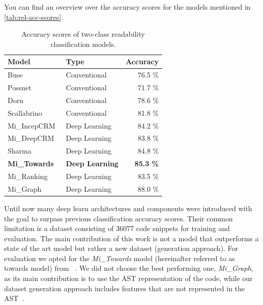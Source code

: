 \documentclass[%
class=scrreprt,
chapterprefix=false,%
open=right,%
twoside=false,%
paper=a4,%
logofile={Logo\_zentral\_farbig\_EN.png},%
thesistype=master,%
UKenglish,%
]{se2thesis}
\theoremstyle{definition}
\newcommand{\numOriginal}{36077 }
\begin{document}
	You can find an overview over the accuracy scores for the models mentioned in \autoref{tab:rel-acc-scores}.
	\begin{table}[tb]
		\centering
		\caption{Accuracy scores of two-class readability classification models.}
		\vspace{8pt}
		\label{tab:rel-acc-scores}
		\begin{tabular}{llr}
			\toprule
			Model & Type & Accuracy \\
			\midrule
			Buse~\cite{buse2009learning} & Conventional & 76.5 \% \\
			Possnet~\cite{posnett2011simpler} & Conventional & 71.7 \% \\
			Dorn~\cite{dorn2012general} & Conventional & 78.6 \% \\
			Scallabrino~\cite{scalabrino2018comprehensive} & Conventional & 81.8 \% \\
			Mi\_IncepCRM~\cite{mi2018inception} & Deep Learning & 84.2 \% \\
			Mi\_DeepCRM~\cite{mi2018improving} & Deep Learning & 83.8 \% \\
			Sharma~\cite{sharma2020egan} & Deep Learning & 84.8 \% \\
			\textbf{Mi\_Towards~\cite{mi2022towards}} & \textbf{Deep Learning} & \textbf{85.3 \%} \\
			Mi\_Ranking~\cite{mi2022rank} & Deep Learning & 83.5 \% \\
			Mi\_Graph~\cite{mi2023graph} & Deep Learning & 88.0 \% \\
			\bottomrule
		\end{tabular}
	\end{table}
	
	Until now many deep learn architectures and components were introduced with the goal to surpass previous classification accuracy scores. Their common limitation is a dataset consisting of \numOriginal code snippets for training and evaluation.
	The main contribution of this work is not a model that outperforms a state of the art model but rather a new dataset (generation approach). For evaluation we opted for the \textit{Mi\_Towards} model (hereinafter referred to as towards model) from \citeauthor{mi2022towards}~\cite{mi2022towards}. We did not choose the best performing one, \textit{Mi\_Graph}, as its main contribution is to use the AST representation of the code, while our dataset generation approach includes features that are not represented in the AST~\cite{mi2023graph}.
			
\end{document}
